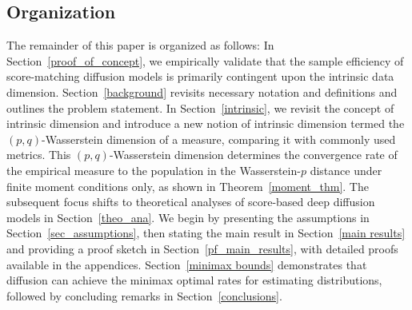 \documentclass[12pts]{article}
\begin{document}
\subsection{Organization} The remainder of this paper is organized as follows: In Section~\ref{proof_of_concept}, we empirically validate that the sample efficiency of score-matching diffusion models is primarily contingent upon the intrinsic data dimension.  Section~\ref{background} revisits necessary notation and definitions and outlines the problem statement. In Section~\ref{intrinsic}, we revisit the concept of intrinsic dimension and introduce a new notion of intrinsic dimension termed the $(p,q)$-Wasserstein dimension of a measure, comparing it with commonly used metrics. This $(p,q)$-Wasserstein dimension determines the convergence rate of the empirical measure to the population in the Wasserstein-$p$ distance under finite moment conditions only, as shown in Theorem~\ref{moment_thm}. The subsequent focus shifts to theoretical analyses of score-based deep diffusion models in Section~\ref{theo_ana}. We begin by presenting the assumptions in Section~\ref{sec_assumptions}, then stating the main result in Section~\ref{main results} and providing a proof sketch in Section~\ref{pf_main_results}, with detailed proofs available in the appendices. Section~\ref{minimax bounds} demonstrates that diffusion can achieve the minimax optimal rates for estimating distributions, followed by concluding remarks in Section~\ref{conclusions}.
\end{document}
